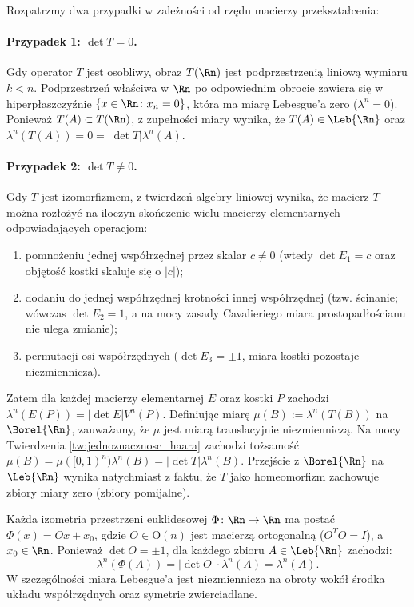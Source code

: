 \begin{dow}
    Rozpatrzmy dwa przypadki w zależności od rzędu macierzy przekształcenia:

    \paragraph{Przypadek 1: $\det T = 0$.}
    Gdy operator $T$ jest osobliwy, obraz $T(\Rn)$ jest podprzestrzenią liniową wymiaru $k < n$. Podprzestrzeń właściwa w $\Rn$ po odpowiednim obrocie zawiera się w hiperpłaszczyźnie $\{x \in \Rn \colon x_n = 0\}$, która ma miarę Lebesgue'a zero ($\lambda^n = 0$). Ponieważ $T(A) \subset T(\Rn)$, z zupełności miary wynika, że $T(A) \in \Leb{\Rn}$ oraz $\lambda^n(T(A)) = 0 = |\det T| \lambda^n(A)$.

    \paragraph{Przypadek 2: $\det T \neq 0$.}
    Gdy $T$ jest izomorfizmem, z twierdzeń algebry liniowej wynika, że macierz $T$ można rozłożyć na iloczyn skończenie wielu macierzy elementarnych odpowiadających operacjom:
    \begin{enumerate}
        \item[(a)] pomnożeniu jednej współrzędnej przez skalar $c \neq 0$ (wtedy $\det E_1 = c$ oraz objętość kostki skaluje się o $|c|$);
        \item[(b)] dodaniu do jednej współrzędnej krotności innej współrzędnej (tzw. ścinanie; wówczas $\det E_2 = 1$, a na mocy zasady Cavalieriego miara prostopadłościanu nie ulega zmianie);
        \item[(c)] permutacji osi współrzędnych ($\det E_3 = \pm 1$, miara kostki pozostaje niezmiennicza).
    \end{enumerate}
    Zatem dla każdej macierzy elementarnej $E$ oraz kostki $P$ zachodzi $\lambda^n(E(P)) = |\det E| V^n(P)$. Definiując miarę $\mu(B) := \lambda^n(T(B))$ na $\Borel{\Rn}$, zauważamy, że $\mu$ jest miarą translacyjnie niezmienniczą. Na mocy Twierdzenia \ref{tw:jednoznacznosc_haara} zachodzi tożsamość $\mu(B) = \mu([0, 1)^n) \lambda^n(B) = |\det T| \lambda^n(B)$.
    Przejście z $\Borel{\Rn}$ na $\Leb{\Rn}$ wynika natychmiast z faktu, że $T$ jako homeomorfizm zachowuje zbiory miary zero (zbiory pomijalne).
\end{dow}

\begin{wn}
    Każda izometria przestrzeni euklidesowej $\Phi \colon \Rn \to \Rn$ ma postać $\Phi(x) = Ox + x_0$, gdzie $O \in \mathrm{O}(n)$ jest macierzą ortogonalną ($O^T O = I$), a $x_0 \in \Rn$. Ponieważ $\det O = \pm 1$, dla każdego zbioru $A \in \Leb{\Rn}$ zachodzi:
    \begin{equation}
        \lambda^n(\Phi(A)) = |\det O| \cdot \lambda^n(A) = \lambda^n(A).
    \end{equation}
    W szczególności miara Lebesgue'a jest niezmiennicza na obroty wokół środka układu współrzędnych oraz symetrie zwierciadlane.
\end{wn}

